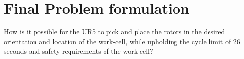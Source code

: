 \section{Final Problem formulation} \label{ch:finalprob}
 
 
 How is it possible for the UR5 to pick and place the rotors in the desired orientation and location of the work-cell, while upholding the cycle limit of 26 seconds and safety requirements of the work-cell? 
 
 
 
